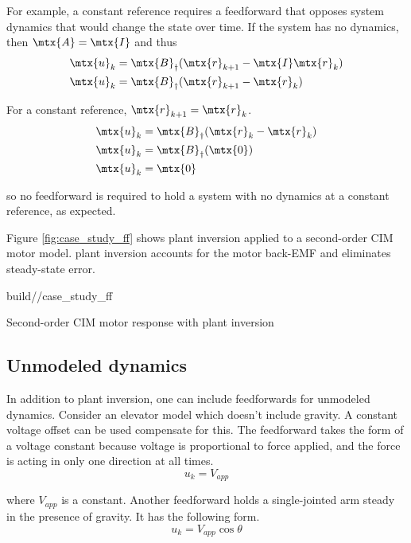 For example, a constant \gls{reference} requires a feedforward that opposes
\gls{system} dynamics that would change the \gls{state} over time. If the
\gls{system} has no dynamics, then $\mtx{A} = \mtx{I}$ and thus
\begin{align*}
  \mtx{u}_k &= \mtx{B}_\dagger (\mtx{r}_{k+1} - \mtx{I}\mtx{r}_k) \\
  \mtx{u}_k &= \mtx{B}_\dagger (\mtx{r}_{k+1} - \mtx{r}_k)
\end{align*}

For a constant \gls{reference}, $\mtx{r}_{k+1} = \mtx{r}_k$.
\begin{align*}
  \mtx{u}_k &= \mtx{B}_\dagger (\mtx{r}_k - \mtx{r}_k) \\
  \mtx{u}_k &= \mtx{B}_\dagger (\mtx{0}) \\
  \mtx{u}_k &= \mtx{0}
\end{align*}

so no feedforward is required to hold a \gls{system} with no dynamics at a
constant \gls{reference}, as expected.

Figure \ref{fig:case_study_ff} shows \gls{plant} inversion applied to a
second-order CIM motor model. \Gls{plant} inversion accounts for the motor
back-EMF and eliminates steady-state error.
\begin{svg}{build/\chapterpath/case_study_ff}
  \caption{Second-order CIM motor response with plant inversion}
  \label{fig:case_study_ff}
\end{svg}

\subsection{Unmodeled dynamics}

In addition to \gls{plant} inversion, one can include feedforwards for unmodeled
dynamics. Consider an elevator model which doesn't include gravity. A constant
voltage offset can be used compensate for this. The feedforward takes the form
of a voltage constant because voltage is proportional to force applied, and the
force is acting in only one direction at all times.
\begin{equation}
  u_k = V_{app}
\end{equation}

where $V_{app}$ is a constant. Another feedforward holds a single-jointed arm
steady in the presence of gravity. It has the following form.
\begin{equation}
  u_k = V_{app} \cos\theta
\end{equation}

